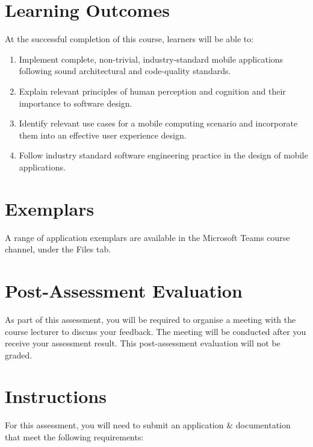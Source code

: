 \documentclass{article}
\begin{document}
\section*{Learning Outcomes}
At the successful completion of this course, learners will be able to:
\begin{enumerate}
	\item Implement complete, non-trivial, industry-standard mobile applications following sound architectural and code-quality standards.
	\item Explain relevant principles of human perception and cognition and their importance to software design.
	\item Identify relevant use cases for a mobile computing scenario and incorporate them into an effective user experience design.
	\item Follow industry standard software engineering practice in the design of mobile applications.
\end{enumerate}

\section*{Exemplars}
A range of application exemplars are available in the Microsoft Teams course channel, under the Files tab.

\section*{Post-Assessment Evaluation}
As part of this assessment, you will be required to organise a meeting with the course lecturer to discuss your feedback. The meeting will be conducted after you receive your assessment result. This post-assessment evaluation will not be graded.

\newpage

\section*{Instructions} 
For this assessment, you will need to submit an application \& documentation that meet the following requirements:
\end{document}
